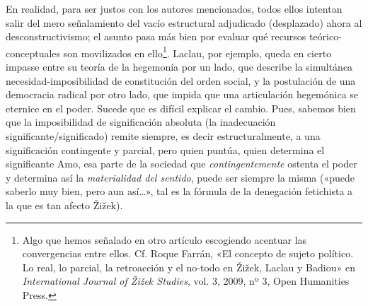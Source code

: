 En realidad, para ser justos con los autores mencionados, todos ellos intentan salir del mero señalamiento del vacío estructural adjudicado (desplazado) ahora al desconstructivismo; el asunto pasa más bien por evaluar qué recursos teórico-conceptuales son movilizados en ello\footnote{Algo que hemos señalado en otro artículo escogiendo acentuar las convergencias entre ellos. Cf. Roque Farrán, «El concepto de sujeto político. Lo real, lo parcial, la retroacción y el no-todo en Žižek, Laclau y Badiou» en \emph{International Journal of Žižek Studies}, vol. 3, 2009, nº 3, Open Humanities Press.}. Laclau, por ejemplo, queda en cierto impasse entre su teoría de la hegemonía por un lado, que describe la simultánea necesidad-imposibilidad de constitución del orden social, y la postulación de una democracia radical por otro lado, que impida que una articulación hegemónica se eternice en el poder. Sucede que es difícil explicar el cambio. Pues, sabemos bien que la imposibilidad de significación absoluta (la inadecuación significante/significado) remite siempre, es decir estructuralmente, a una significación contingente y parcial, pero quien puntúa, quien determina el significante Amo, esa parte de la sociedad que \emph{contingentemente} ostenta el poder y determina así la \emph{materialidad del sentido}, puede ser siempre la misma («puede saberlo muy bien, pero aun así\ldots», tal es la fórmula de la denegación fetichista a la que es tan afecto Žižek).

